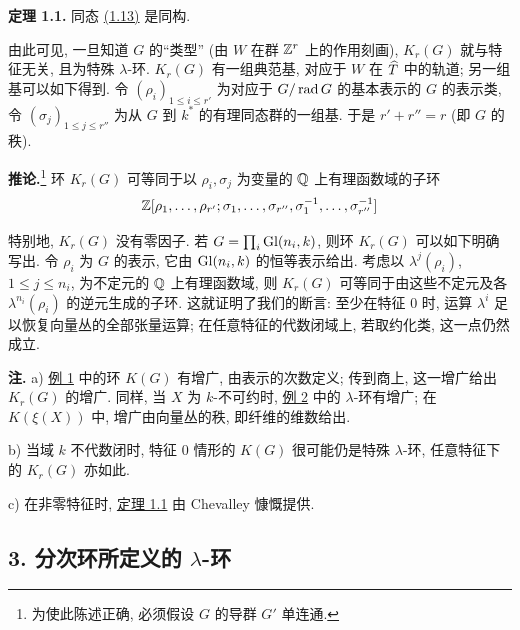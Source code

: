 \textbf{定理 1.1.} 同态 \hyperlink{sga6.e00.eq.1-13}{(1.13)} 是同构.

由此可见, 一旦知道 $G$ 的“类型” (由 $W$ 在群 $\mathbb Z^r$ 上的作用刻画), $K_r(G)$ 就与特征无关, 且为特殊 $\lambda$-环. $K_r(G)$ 有一组典范基, 对应于 $W$ 在 $\widehat T$ 中的轨道; 另一组基可以如下得到. 令 $(\rho_i)_{1\leq i\leq r'}$ 为对应于 $G/\operatorname{rad} G$ 的基本表示的 $G$ 的表示类, 令 $(\sigma_j)_{1\leq j\leq r''}$ 为从 $G$ 到 $k^*$ 的有理同态群的一组基. 于是 $r'+r''=r$ (即 $G$ 的秩).

\textbf{推论.}\footnote{为使此陈述正确, 必须假设 $G$ 的导群 $G'$ 单连通.} 环 $K_r(G)$ 可等同于以 $\rho_i,\sigma_j$ 为变量的 $\mathbb Q$ 上有理函数域的子环
\[
\mathbb Z[\rho_1,\ldots,\rho_{r'};\sigma_1,\ldots,\sigma_{r''},\sigma_1^{-1},\ldots,\sigma_{r''}^{-1}]
\]

特别地, $K_r(G)$ 没有零因子. 若 $G=\prod_i\operatorname{Gl}(n_i,k)$, 则环 $K_r(G)$ 可以如下明确写出. 令 $\rho_i$ 为 $G$ 的表示, 它由 $\operatorname{Gl}(n_i,k)$ 的恒等表示给出. 考虑以 $\lambda^j(\rho_i)$, $1\leq j\leq n_i$, 为不定元的 $\mathbb Q$ 上有理函数域, 则 $K_r(G)$ 可等同于由这些不定元及各 $\lambda^{n_i}(\rho_i)$ 的逆元生成的子环. 这就证明了我们的断言: 至少在特征 $0$ 时, 运算 $\lambda^i$ 足以恢复向量丛的全部张量运算; 在任意特征的代数闭域上, 若取约化类, 这一点仍然成立.

\textbf{注.} a) \hyperlink{sga6.e00.ex.2-1}{例 1} 中的环 $K(G)$ 有增广, 由表示的次数定义; 传到商上, 这一增广给出 $K_r(G)$ 的增广. 同样, 当 $X$ 为 $k$-不可约时, \hyperlink{sga6.e00.ex.2-2}{例 2} 中的 $\lambda$-环有增广; 在 $K(\xi(X))$ 中, 增广由向量丛的秩, 即纤维的维数给出.

b) 当域 $k$ 不代数闭时, 特征 $0$ 情形的 $K(G)$ 很可能仍是特殊 $\lambda$-环, 任意特征下的 $K_r(G)$ 亦如此.

c) 在非零特征时, \hyperlink{sga6.e00.thm.1-1}{定理 1.1} 由 Chevalley 慷慨提供.

\subsection*{3. 分次环所定义的 $\lambda$-环}

